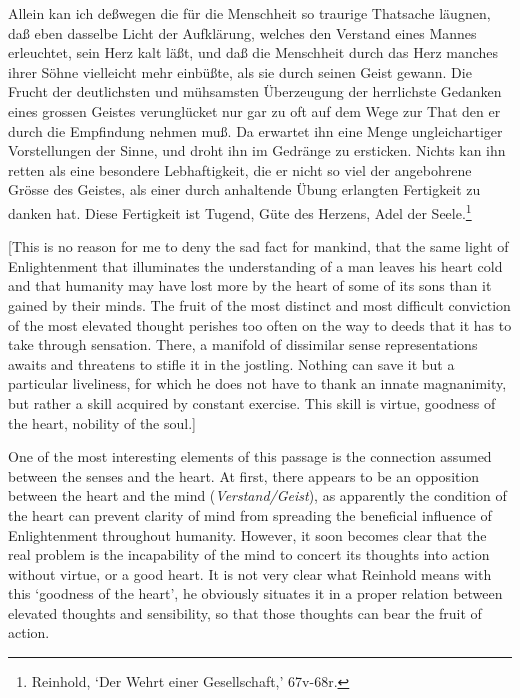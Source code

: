 Allein kan ich de\ss{}wegen die f\"{u}r die Menschheit so traurige Thatsache l\"{a}ugnen, da\ss{} eben dasselbe Licht der Aufkl\"{a}rung, welches den Verstand eines Mannes erleuchtet, sein Herz kalt l\"{a}\ss{}t, und da\ss{} die Menschheit durch das Herz manches ihrer S\"{o}hne vielleicht mehr einb\"{u}\ss{}te, als sie durch seinen Geist gewann. Die Frucht der deutlichsten und m\"{u}hsamsten \"{U}berzeugung der herrlichste Gedanken eines grossen Geistes verungl\"{u}cket nur gar zu oft auf dem Wege zur That den er durch die Empfindung nehmen mu\ss{}. Da erwartet ihn eine Menge ungleichartiger Vorstellungen der Sinne, und droht ihn im Gedr\"{a}nge zu ersticken. Nichts kan ihn retten als eine besondere Lebhaftigkeit, die er nicht so viel der angebohrene Gr\"{o}sse des Geistes, als einer durch anhaltende \"{U}bung erlangten Fertigkeit zu danken hat. Diese Fertigkeit ist Tugend, G\"{u}te des Herzens, Adel der Seele.\footnote{ Reinhold, `Der Wehrt einer Gesellschaft,' 67v{-}68r.}

[This is no reason for me to deny the sad fact for mankind, that the same light of Enlightenment that illuminates the understanding of a man leaves his heart cold and that humanity may have lost more by the heart of some of its sons than it gained by their minds. The fruit of the most distinct and most difficult conviction of the most elevated thought perishes too often on the way to deeds that it has to take through sensation. There, a manifold of dissimilar sense representations awaits and threatens to stifle it in the jostling. Nothing can save it but a particular liveliness, for which he does not have to thank an innate magnanimity, but rather a skill acquired by constant exercise. This skill is virtue, goodness of the heart, nobility of the soul.]

One of the most interesting elements of this passage is the connection assumed between the senses and the heart. At first, there appears to be an opposition between the heart and the mind (\textit{Verstand/Geist}), as apparently the condition of the heart can prevent clarity of mind from spreading the beneficial influence of Enlightenment throughout humanity. However, it soon becomes clear that the real problem is the incapability of the mind to concert its thoughts into action without virtue, or a good heart. It is not very clear what Reinhold means with this `goodness of the heart', he obviously situates it in a proper relation between elevated thoughts and sensibility, so that those thoughts can bear the fruit of action. 

